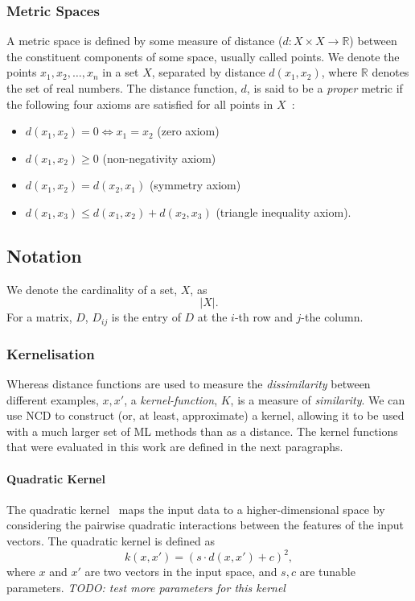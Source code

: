 \documentclass[preprint,12pt]{elsarticle}
\newcommand{\cm}[1]{\textit{{\color{blue}#1}}}
\begin{document}
\subsubsection{Metric Spaces}
\label{metric_spaces}
A metric space is defined by some measure of distance ($d:X \times X \rightarrow \mathbb{R}$) between the constituent components of some space, usually called points. 
We denote the points $x_1,x_2,\ldots,x_n$  in a set $X$, separated by distance $d(x_1,x_2)$, where  $\mathbb{R}$ denotes the set of real numbers. 
The distance function, $d$, is said to be a \textit{proper} metric if the following four axioms are satisfied for all points in $X$~\cite{metrics}:

\begin{itemize}
    \item $d(x_1,x_2) = 0 \iff x_1 = x_2$ (zero axiom)
    \item $d(x_1,x_2) \geq 0$ (non-negativity axiom)
    \item $d(x_1,x_2) = d(x_2, x_1)$ (symmetry axiom)
    \item $d(x_1, x_3) \leq d(x_1,x_2) + d(x_2,x_3)$ (triangle inequality axiom).
\end{itemize}

\subsection{Notation}
We denote the cardinality of a set, $X$, as
$$
    | X |.
$$
For a matrix, $D$, $D_{ij}$ is the entry of $D$ at the $i$-th row and $j$-the column.

\subsubsection{Kernelisation}
\label{kernels}

Whereas distance functions are used to measure the \textit{dissimilarity} between different examples, $x,x'$, a \textit{kernel-function}, $K$, is a measure of \textit{similarity}. 
We can use NCD to construct (or, at least, approximate) a kernel, allowing it to be used with a much larger set of ML methods than as a distance.
The kernel functions that were evaluated in this work are defined in the next paragraphs.



\paragraph{Quadratic Kernel}
\label{quadratic_kernel}
The quadratic kernel~\cite{kernels} maps the input data to a higher-dimensional space by considering the pairwise quadratic interactions between the features of the input vectors.
The quadratic kernel is defined as
$$
    k(x, x') = (s \cdot d(x,x') + c)^2,
$$
where $x$ and $x'$ are two vectors in the input space, and $s, c$ are tunable parameters.
\cm{TODO: test more parameters for this kernel}
\end{document}
